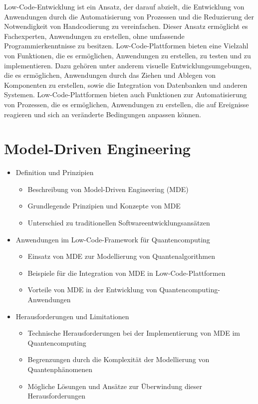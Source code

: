 Low-Code-Entwicklung ist ein Ansatz, der darauf abzielt, die Entwicklung von Anwendungen
durch die Automatisierung von Prozessen und die Reduzierung der Notwendigkeit von
Handcodierung zu vereinfachen. Dieser Ansatz ermöglicht es Fachexperten, Anwendungen
zu erstellen, ohne umfassende Programmierkenntnisse zu besitzen. Low-Code-Plattformen
bieten eine Vielzahl von Funktionen, die es ermöglichen, Anwendungen zu erstellen, zu
testen und zu implementieren. Dazu gehören unter anderem visuelle Entwicklungsumgebungen,
die es ermöglichen, Anwendungen durch das Ziehen und Ablegen von Komponenten zu erstellen,
sowie die Integration von Datenbanken und anderen Systemen. Low-Code-Plattformen bieten
auch Funktionen zur Automatisierung von Prozessen, die es ermöglichen, Anwendungen zu
erstellen, die auf Ereignisse reagieren und sich an veränderte Bedingungen anpassen können.

\section{Model-Driven Engineering}
\begin{itemize}
    \item Definition und Prinzipien
        \begin{itemize}
            \item Beschreibung von Model-Driven Engineering (MDE)
            \item Grundlegende Prinzipien und Konzepte von MDE
            \item Unterschied zu traditionellen Softwareentwicklungsansätzen
        \end{itemize}
    \item Anwendungen im Low-Code-Framework für Quantencomputing
        \begin{itemize}
            \item Einsatz von MDE zur Modellierung von Quantenalgorithmen
            \item Beispiele für die Integration von MDE in Low-Code-Plattformen
            \item Vorteile von MDE in der Entwicklung von Quantencomputing-Anwendungen
        \end{itemize}
    \item Herausforderungen und Limitationen
        \begin{itemize}
            \item Technische Herausforderungen bei der Implementierung von MDE im Quantencomputing
            \item Begrenzungen durch die Komplexität der Modellierung von Quantenphänomenen
            \item Mögliche Lösungen und Ansätze zur Überwindung dieser Herausforderungen
        \end{itemize}
\end{itemize}

